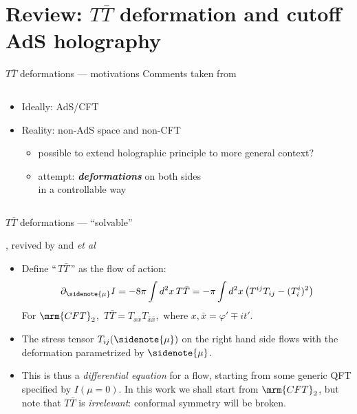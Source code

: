 \documentclass[
	10pt
	,handout
	,noamsthm
]{beamer}
\newcommand{\TTbar}{\texorpdfstring{\ensuremath{T\bar{T}}}{TTbar}\xspace}
\begin{document}
\section{\textbf{Review:} \TTbar deformation and cutoff AdS holography} \label{se:cutoffholography}

\begin{frame}{\TTbar deformations --- motivations}{%
	Comments taken from \textcite{Cui:2023jrb}
}
\begin{columns}
\figAdsCft
\begin{column}{.72\textwidth}
	\begin{itemize}
	\item Ideally: AdS/CFT
	\item Reality: non-AdS space and non-CFT
	\begin{itemize}
		\item possible to extend holographic principle to more general context?
		\item attempt: \textbf{\textit{deformations}} on both sides\\
		in a controllable way
	\end{itemize}
	\end{itemize}
\end{column}
\end{columns}
\end{frame}

\newcommand{\citeTTbar}{%
	\textcite{Zamolodchikov:2004ce}, revived by \textcite{Smirnov:2016lqw} and \textcite{Cavaglia:2016oda} \textit{et al}
}


\begin{frame}{\TTbar deformations --- ``solvable''}{%
	\citeTTbar
}
\begin{itemize}

\item Define ``\,\TTbar\,'' as the flow of action:
\begin{equation}
	\partial_{\sidenote{\mu}} I = -{8 \pi} \int d^2x \, T\bar T =  -{\pi} \int d^2x\,\big( T^{ij}T_{ij}- (T^i_i)^2 \big)
	\label{TTbardef}
\end{equation}
For $\mrm{CFT}_2$,\ $T\bar{T} = T_{xx} T_{\bar{x}\bar{x}}$,\ where $x, \bar{x} = \varphi' \mp it'$.

\item The stress tensor $T_{ij}(\sidenote{\mu})$ on the right hand side flows with the deformation parametrized by $\sidenote{\mu}$. 

\pause

\item This is thus a \textit{differential equation} for a flow, starting from some generic QFT specified by $I(\mu = 0)$. In this work we shall start from $\mrm{CFT}_2$, but note that \TTbar is \textit{irrelevant}: conformal symmetry will be broken.

\end{itemize}
\end{frame}
\end{document}
